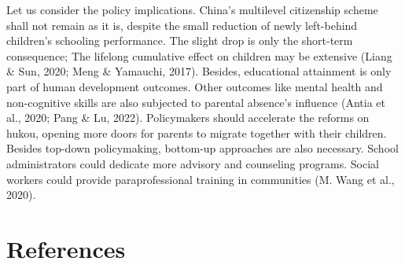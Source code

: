 \documentclass[
  man,floatsintext]{apa7}
\begin{document}
Let us consider the policy implications. China's multilevel citizenship scheme shall not remain as it is, despite the small reduction of newly left-behind children's schooling performance. The slight drop is only the short-term consequence; The lifelong cumulative effect on children may be extensive (Liang \& Sun, 2020; Meng \& Yamauchi, 2017). Besides, educational attainment is only part of human development outcomes. Other outcomes like mental health and non-cognitive skills are also subjected to parental absence's influence (Antia et al., 2020; Pang \& Lu, 2022). Policymakers should accelerate the reforms on hukou, opening more doors for parents to migrate together with their children. Besides top-down policymaking, bottom-up approaches are also necessary. School administrators could dedicate more advisory and counseling programs. Social workers could provide paraprofessional training in communities (M. Wang et al., 2020).

\newpage

\hypertarget{references}{%
\section{References}\label{references}}
\end{document}
